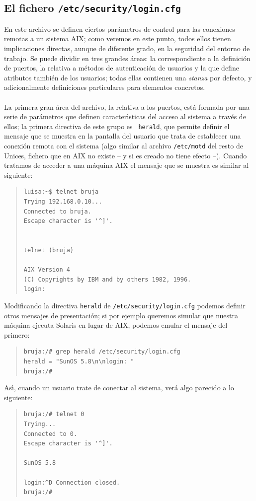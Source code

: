 \subsection{El fichero {\tt /etc/security/login.cfg}}
En este archivo se definen ciertos par\'ametros de control para las conexiones
remotas a un sistema AIX; como veremos en este punto, todos ellos tienen
implicaciones directas, aunque de diferente grado, en la seguridad del entorno
de trabajo. Se puede dividir en tres grandes \'areas: la correspondiente a la
definici\'on de puertos, la relativa a m\'etodos de autenticaci\'on de usuarios
y la que define atributos tambi\'en de los usuarios; todas ellas contienen una
{\it stanza} por defecto, y adicionalmente definiciones particulares para 
elementos concretos.\\
\\La primera gran \'area del archivo, la relativa a los puertos, est\'a formada
por una serie de par\'ametros que definen caracter\'{\i}sticas del acceso al
sistema a trav\'es de ellos; la primera directiva de este grupo es {\tt 
herald}, que permite definir el
mensaje que se muestra en la pantalla del usuario que trata de establecer una
conexi\'on remota con el sistema (algo similar al archivo {\tt /etc/motd} del
resto de Unices, fichero que en AIX no existe -- y si es creado no tiene efecto 
--). Cuando tratamos de acceder a una m\'aquina AIX el mensaje que se muestra
es similar al siguiente:
\begin{quote}
\begin{verbatim}
luisa:~$ telnet bruja
Trying 192.168.0.10...
Connected to bruja.
Escape character is '^]'.


telnet (bruja)

AIX Version 4
(C) Copyrights by IBM and by others 1982, 1996.
login:  
\end{verbatim}
\end{quote}
Modificando la directiva {\tt herald} de {\tt /etc/security/login.cfg} podemos
definir otros mensajes de presentaci\'on; si por ejemplo queremos simular que
nuestra m\'aquina ejecuta Solaris en lugar de AIX, podemos emular el mensaje
del primero:
\begin{quote}
\begin{verbatim}
bruja:/# grep herald /etc/security/login.cfg
herald = "SunOS 5.8\n\nlogin: "
bruja:/# 
\end{verbatim}
\end{quote}
As\'{\i}, cuando un usuario trate de conectar al sistema, ver\'a algo parecido 
a lo siguiente:
\begin{quote}
\begin{verbatim}
bruja:/# telnet 0
Trying...
Connected to 0.
Escape character is '^]'.

SunOS 5.8

login:^D Connection closed.
bruja:/#
\end{verbatim}
\end{quote}
